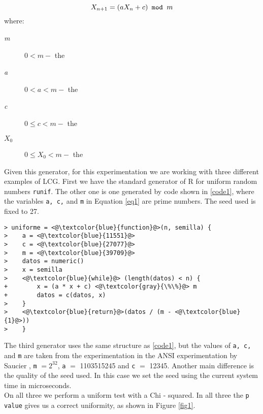 \documentclass{article}
\begin{document}
\begin{equation} \label{eq1}
X_{n+1} = (aX_n + c) \mbox{\texttt{ mod }} m
\end{equation}
where:
\begin{description}
\item[\textit{m}] $0 < m - $ the 
\item[\textit{a}] $0 < a < m -$ the  
\item[\textit{c}] $0 \leq c < m -$ the  
\item[\textit{$X_0$}] $0 \leq  X_0 < m - $ the  
\end{description}

Given this generator, for this experimentation we are working with three different examples of LCG. First we have the standard generator of R for uniform random numbers \texttt{runif}. The other one is one generated by code shown in \ref{code1}, where the variables \texttt{a, c,} and \texttt{m} in Equation \ref{eq1} are prime numbers. The seed used is fixed to 27.\\

\begin{lstlisting}[caption = Code for uniform random numbers in R, label=code1]
> uniforme = <@\textcolor{blue}{function}@>(n, semilla) {
>    a = <@\textcolor{blue}{11551}@>
>    c = <@\textcolor{blue}{27077}@>
>    m = <@\textcolor{blue}{39709}@>
>    datos = numeric()
>    x = semilla
>    <@\textcolor{blue}{while}@> (length(datos) < n) {
+        x = (a * x + c) <@\textcolor{gray}{\%\%}@> m
+        datos = c(datos, x)
>    }
>    <@\textcolor{blue}{return}@>(datos / (m - <@\textcolor{blue}{1}@>))
>    }
\end{lstlisting}


The third generator uses the same structure as \ref{code1}, but the values of \texttt{a, c,} and \texttt{m} are taken from the experimentation in the ANSI experimentation by Saucier \cite{saucier}, \texttt{m} $= 2^{32}$, \texttt{a} $=$ 1103515245 and \texttt{c} $=$ 12345. Another main difference is the quality of the seed used. In this case we set the seed using the current system time in microseconds.\\ 

On all three we perform a uniform test with a Chi - squared. In all three the \texttt{p value} gives us a correct uniformity, as shown in Figure \ref{fig1}.\\
\end{document}
